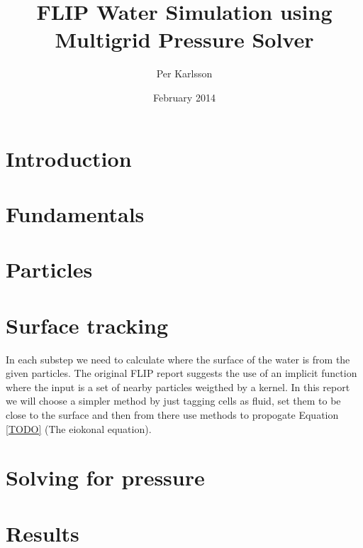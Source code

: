 \documentclass[a4paper,12pt]{article}
\begin{document}
\title{FLIP Water Simulation using Multigrid Pressure Solver}
\author{Per Karlsson}
\date{February 2014}
\maketitle



\tableofcontents
\setcounter{tocdepth}{2}

\newpage
\section{Introduction}


%
%

\newpage
\section{Fundamentals}






\newpage
\section{Particles}





\newpage
\section{Surface tracking}
In each substep we need to calculate where the surface of the water is from the given particles. The original FLIP report suggests the use of an implicit function where the input is a set of nearby particles weigthed by a kernel. In this report we will choose a simpler method by just tagging cells as fluid, set them to be close to the surface and then from there use methods to propogate Equation \ref{TODO} (The eiokonal equation).




\newpage
\section{Solving for pressure}







\newpage
\section{Results}

\newpage



\newpage

\end{document}
